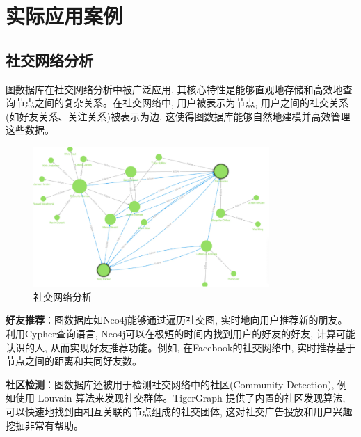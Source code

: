 \section{实际应用案例}

\subsection{社交网络分析}
图数据库在社交网络分析中被广泛应用, 其核心特性是能够直观地存储和高效地查询节点之间的复杂关系。在社交网络中, 用户被表示为节点, 用户之间的社交关系(如好友关系、关注关系)被表示为边, 这使得图数据库能够自然地建模并高效管理这些数据。

\begin{figure}
    \centering
    \includegraphics[width=0.8\textwidth]{images/24.png}
    \caption{社交网络分析}
    \label{fig:24}
\end{figure}
\textbf{好友推荐}：图数据库如Neo4j能够通过遍历社交图, 实时地向用户推荐新的朋友。利用Cypher查询语言, Neo4j可以在极短的时间内找到用户的好友的好友, 计算可能认识的人, 从而实现好友推荐功能。例如, 在Facebook的社交网络中, 实时推荐基于节点之间的距离和共同好友数\cite{ahmad2020missing,wang2022common}。


\textbf{社区检测}：图数据库还被用于检测社交网络中的社区(Community Detection), 例如使用 Louvain 算法来发现社交群体。TigerGraph 提供了内置的社区发现算法, 可以快速地找到由相互关联的节点组成的社交团体, 这对社交广告投放和用户兴趣挖掘非常有帮助\cite{tsitseklis2020scalable,beis2015benchmarking}。


